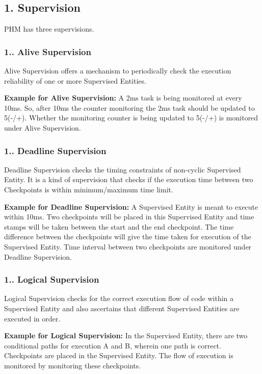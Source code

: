 \subsection*{1. Supervision}

P\+HM has three supervisions.

\subsubsection*{1.. Alive Supervision}

Alive Supervision offers a mechanism to periodically check the execution reliability of one or more Supervised Entities.

 {\bfseries Example for Alive Supervision\+:} A 2ms task is being monitored at every 10ms. So, after 10ms the counter monitoring the 2ms task should be updated to 5(-\//+). Whether the monitoring counter is being updated to 5(-\//+) is monitored under Alive Supervision.

\subsubsection*{1.. Deadline Supervision}

Deadline Supervision checks the timing constraints of non-\/cyclic Supervised Entity. It is a kind of supervision that checks if the execution time between two Checkpoints is within minimum/maximum time limit.

 {\bfseries Example for Deadline Supervision\+:} A Supervised Entity is meant to execute within 10ms. Two checkpoints will be placed in this Supervised Entity and time stamps will be taken between the start and the end checkpoint. The time difference between the checkpoints will give the time taken for execution of the Supervised Entity. Time interval between two checkpoints are monitored under Deadline Supervision.

\subsubsection*{1.. Logical Supervision}

Logical Supervision checks for the correct execution flow of code within a Supervised Entity and also ascertains that different Supervised Entities are executed in order.

{\bfseries Example for Logical Supervision\+:} In the Supervised Entity, there are two conditional paths for execution A and B, wherein one path is correct. Checkpoints are placed in the Supervised Entity. The flow of execution is monitored by monitoring these checkpoints.

